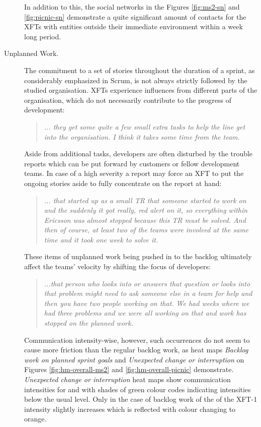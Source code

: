 \begin{description}
In addition to this, the social networks in the Figures \ref{fig:ms2-sn} and \ref{fig:picnic-sn} demonstrate a quite significant amount of contacts for the \acp{XFT} with entities outside their immediate environment within a week long period.

    \item [Unplanned Work.] The commitment to a set of stories throughout the duration of a sprint, as considerably emphasized in Scrum, is not always strictly followed by the studied organisation. \acp{XFT} experience influences from different parts of the organisation, which do not necessarily contribute to the progress of development:

      \begin{quote}\itshape... they get some quite a few small extra tasks to help the line get into the organisation. I think it takes some time from the team.
      \end{quote}

   Aside from additional tasks, developers are often disturbed by the trouble reports which can be put forward by customers or fellow development teams. In case of a high severity a report may force an \ac{XFT} to put the ongoing stories aside to fully concentrate on the report at hand:

      \begin{quote}\itshape... that started up as a small TR that someone started to work on and the suddenly it got really, red alert on it, so everything within Ericsson was almost stopped because this TR must be solved. And then of course, at least two of the teams were involved at the same time and it took one week to solve it.
      \end{quote}

   These items of unplanned work being pushed in to the backlog ultimately affect the teams' velocity by shifting the focus of developers:

      \begin{quote}\itshape ...that person who looks into or answers that question or looks into that problem might need to ask someone else in a team for help and then you have two people working on that. We had weeks where we had three problems and we were all working on that and work has stopped on the planned work.
      \end{quote}
      
Communication intensity-wise, however, such occurrences do not seem to cause more friction than the regular backlog work, as heat maps \emph{Backlog work on planned sprint goals} and \emph{Unexpected change or interruption} on Figures \ref{fig:hm-overall-ms2} and \ref{fig:hm-overall-picnic} demonstrate. \emph{Unexpected change or interruption} heat maps show communication intensities for  and  with shades of green colour codes indicating intensities below the usual level. Only in the case of backlog work of the  of the XFT-1 intensity slightly increases which is reflected with colour changing to orange.


\end{description}
